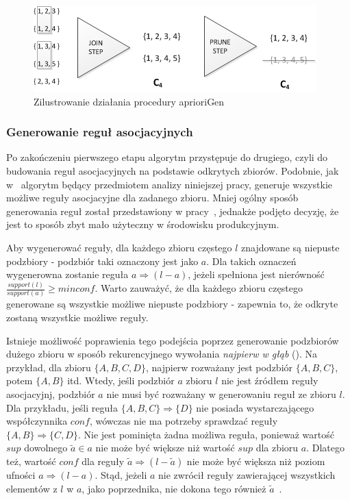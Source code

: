 \begin{figure}[ht]
\centering\includegraphics{figures/02/candidates_generation.png}
\caption{Zilustrowanie działania procedury aprioriGen}\label{rys:example_candidates}
\end{figure}

\subsubsection{Generowanie reguł asocjacyjnych}\label{sec:genrules}
Po zakończeniu pierwszego etapu algorytm przystępuje do drugiego, czyli do budowania reguł asocjacyjnych na podstawie odkrytych zbiorów. Podobnie, jak w~\cite{Apriori:Main} algorytm będący przedmiotem analizy niniejszej pracy, generuje wszystkie możliwe reguły asocjacyjne dla zadanego zbioru. Mniej ogólny sposób generowania reguł został przedstawiony w pracy~\cite{Problem:Statement}, jednakże podjęto decyzję, że jest to sposób zbyt mało użyteczny w środowisku produkcyjnym.

Aby wygenerować reguły, dla każdego zbioru częstego $l$ znajdowane są niepuste podzbiory - podzbiór taki oznaczony jest jako $a$. Dla takich oznaczeń wygenerowna zostanie reguła $a \Rightarrow (l-a)$, jeżeli spełniona jest nierówność $\frac{support(l)}{support(a)} \geq minconf$. Warto zauważyć, że dla każdego zbioru częstego generowane są wszystkie możliwe niepuste podzbiory - zapewnia to, że odkryte zostaną wszystkie możliwe reguły.

Istnieje możliwość poprawienia tego podejścia poprzez generowanie podzbiorów dużego zbioru w sposób rekurencyjnego wywołania \emph{najpierw w głąb} (). Na przykład, dla zbioru $\lbrace A, B, C, D \rbrace$, najpierw rozważany jest podzbiór $\lbrace A, B, C \rbrace$, potem $\lbrace A, B \rbrace$ itd. Wtedy, jeśli podzbiór $a$ zbioru $l$ nie jest źródłem reguły asocjacyjnj, podzbiór $a$ nie musi być rozważany w generowaniu reguł ze zbioru $l$. Dla przykładu, jeśli reguła $\lbrace A, B, C \rbrace \Rightarrow \lbrace D \rbrace$ nie posiada wystarczającego współczynnika $conf$, wówczas nie ma potrzeby sprawdzać reguły $\lbrace A, B \rbrace \Rightarrow \lbrace C, D \rbrace$. Nie jest pominięta żadna możliwa reguła, ponieważ wartość $sup$ dowolnego $\tilde{a} \in a$ nie może być większe niż wartość $sup$ dla zbioru $a$. Dlatego też, wartość $conf$ dla reguły $\tilde{a} \Rightarrow (l - \tilde{a})$ nie może być większa niż poziom ufności $a \Rightarrow (l-a)$. Stąd, jeżeli $a$ nie zwrócił reguły zawierającej wszystkich elementów z $l$ w $a$, jako poprzednika, nie dokona tego również $\tilde{a}$~\cite{Apriori:Main}.

